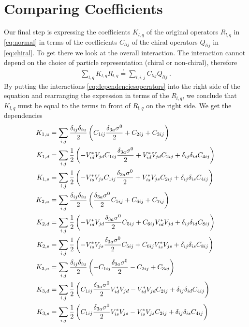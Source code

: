 \section{Comparing Coefficients}
Our final step is expressing the coefficients $K_{l,q}$ of the original operators $R_{l,q}$ in \eqref{eq:normal} in terms of the coefficients $C_{lij}$ of the chiral operators $Q_{lij}$ in \eqref{eq:chiral}. To get there we look at the overall interaction. The interaction cannot depend on the choice of particle representation (chiral or non-chiral), therefore
\begin{align}
	\sum_{l,q} K_{l,q}R_{l,q} \overset{!}{=} \sum_{l,i,j}C_{lij}Q_{lij} \ .
\end{align}
By putting the interactions \eqref{eq:dependenciesoperators} into the right side of the equation and rearranging the expression in terms of the $R_{l,q}$, we conclude that $K_{l,q}$ must be equal to the terms in front of $R_{l,q}$ on the right side. We get the dependencies
\begin{align}\label{eq:CoeffNormal}
	K_{1,u} &= \sum_{i,j}\frac{\delta_{ij}\delta_{iu}}{2}\left(C_{1ij}\frac{\delta_{3a}\sigma^0}{2}+ 
	C_{2ij} + C_{3ij}\right)\notag \\
	K_{1,d} &= \sum_{i,j}\frac{1}{2}\left(-V_{id}^*V_{jd}C_{1ij}\frac{\delta_{3a}\sigma^0}{2}+ V_{id}^*V_{jd}C_{2ij} + \delta_{ij}\delta_{id}C_{4ij}\right)\notag \\
	K_{1,s} &= \sum_{i,j}\frac{1}{2}\left(- V_{is}^*V_{js}C_{1ij}\frac{\delta_{3a}\sigma^0}{2}+ V_{is}^*V_{js}C_{2ij}+ \delta_{ij}\delta_{is}C_{4ij}\right)\notag \\
	K_{2,u} &= \sum_{i,j}\frac{\delta_{ij}\delta_{iu}}{2}\left(\frac{\delta_{3a}\sigma^0}{2}C_{5ij}+ 
	C_{6ij} + C_{7ij}\right)\notag \\
	K_{2,d} &= \sum_{i,j}\frac{1}{2}\left(- V_{id}^*V_{jd}\frac{\delta_{3a}\sigma^0}{2}C_{5ij} + C_{6ij}V_{id}^*V_{jd} + \delta_{ij}\delta_{id}C_{8ij}\right)\notag \\
	K_{2,s} &= \sum_{i,j}\frac{1}{2}\left(- V_{is}^*V_{js}\frac{\delta_{3a}\sigma^0}{2}C_{5ij} + C_{6ij}V_{is}^*V_{js} + \delta_{ij}\delta_{is}C_{8ij}\right)\notag \\
	K_{3,u} &= \sum_{i,j}\frac{\delta_{ij}\delta_{iu}}{2}\left(- C_{1ij}\frac{\delta_{3a}\sigma^0}{2} - C_{2ij} + C_{3ij}\right)\notag \\
	K_{3,d} &= \sum_{i,j}\frac{1}{2}\left(C_{1ij}\frac{\delta_{3a}\sigma^0}{2} V_{id}^*V_{jd} - V_{id}^*V_{jd}C_{2ij} + \delta_{ij}\delta_{id}C_{4ij}\right)\notag \\
	K_{3,s} &= \sum_{i,j}\frac{1}{2}\left(C_{1ij}\frac{\delta_{3a}\sigma^0}{2} V_{is}^*V_{js} - V_{is}^*V_{js}C_{2ij} + \delta_{ij}\delta_{is}C_{4ij}\right)\notag %
\end{align}

